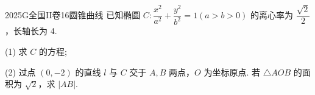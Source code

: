 
\begin{problem}{2025}{G}{全国II卷}{16}{圆锥曲线}
已知椭圆 $C: \dfrac{x^2}{a^2} + \dfrac{y^2}{b^2} = 1 (a>b>0)$ 的离心率为 $\dfrac{\sqrt{2}}{2}$，长轴长为 4.

(1) 求 $C$ 的方程;

(2) 过点 $(0,-2)$ 的直线 $l$ 与 $C$ 交于 $A,B$ 两点，$O$ 为坐标原点. 若 $\triangle AOB$ 的面积为 $\sqrt{2}$，求 $|AB|$.
\end{problem}
